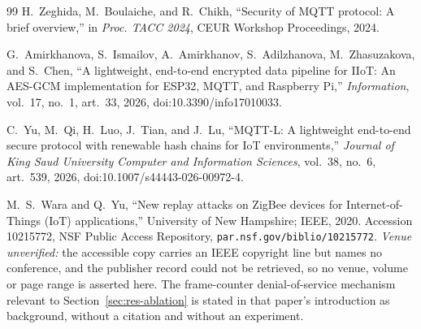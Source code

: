 \begin{thebibliography}{99}
 H.~Zeghida, M.~Boulaiche, and R.~Chikh, ``Security of MQTT protocol: A
brief overview,'' in \emph{Proc. TACC 2024}, CEUR Workshop Proceedings, 2024.

 G.~Amirkhanova, S.~Ismailov, A.~Amirkhanov, S.~Adilzhanova,
M.~Zhasuzakova, and S.~Chen, ``A lightweight, end-to-end encrypted data pipeline for IIoT: An
AES-GCM implementation for ESP32, MQTT, and Raspberry Pi,'' \emph{Information}, vol.~17, no.~1,
art.~33, 2026, doi:10.3390/info17010033.

 C.~Yu, M.~Qi, H.~Luo, J.~Tian, and J.~Lu, ``MQTT-L: A lightweight
end-to-end secure protocol with renewable hash chains for IoT environments,'' \emph{Journal of
King Saud University Computer and Information Sciences}, vol.~38, no.~6, art.~539, 2026,
doi:10.1007/s44443-026-00972-4.

 M.~S.~Wara and Q.~Yu, ``New replay attacks on ZigBee devices for
Internet-of-Things (IoT) applications,'' University of New Hampshire; IEEE, 2020. Accession
10215772, NSF Public Access Repository, \texttt{par.nsf.gov/biblio/10215772}.
\emph{Venue unverified:} the accessible copy carries an IEEE copyright line but names no
conference, and the publisher record could not be retrieved, so no venue, volume or page range is
asserted here. The frame-counter denial-of-service mechanism relevant to
Section~\ref{sec:res-ablation} is stated in that paper's introduction as background, without a
citation and without an experiment.

\end{thebibliography}
